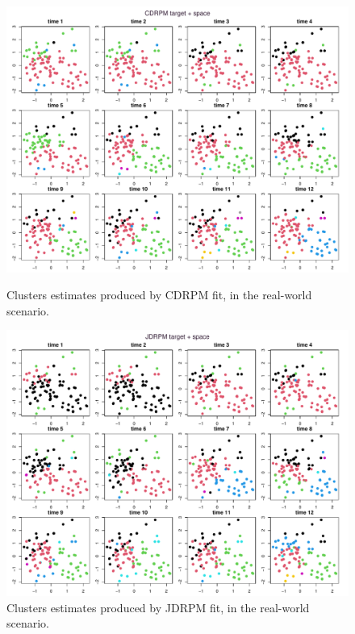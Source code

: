 \documentclass[12pt,	%
	a4paper,		%
	twoside,		%
	openright,		%
	titlepage,%
	]{book}
\theoremstyle{definition}
\begin{document}

\begin{figure}[!ht]
\centering
    \includegraphics[clip, trim=8pt 2pt 8pt 23pt,width=1\linewidth]{Testing/Assessing correctness/simple maps/fitCDRPM target + space_simple_map.pdf}
    \caption[Clusters estimates of CDRPM, real-world scenario]{Clusters estimates produced by CDRPM fit, in the real-world scenario.\vspace{5pt}}
    \label{fig:clusters visualized CDRPM space}
    \includegraphics[clip, trim=8pt 2pt 8pt 23pt,width=1\linewidth]{Testing/Assessing correctness/simple maps/fitJDRPM target + space_simple_map.pdf}
    \caption[Clusters estimates of JDRPM, real-world scenario]{Clusters estimates produced by JDRPM fit, in the real-world scenario.}
    \label{fig:clusters visualized JDRPM space}
\end{figure}
\end{document}
